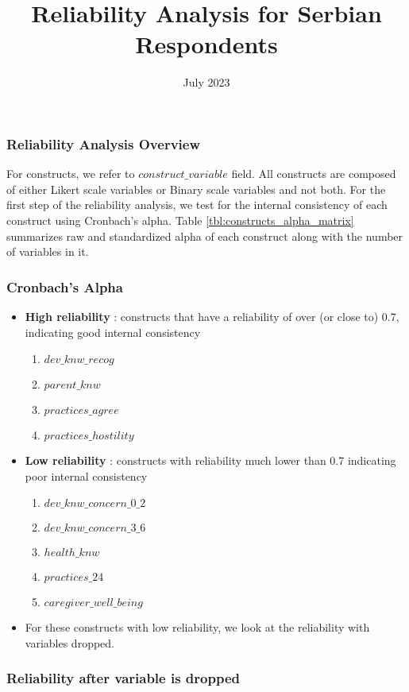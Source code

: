 \documentclass{article}
\title{Reliability Analysis for Serbian Respondents}
\date{July 2023}
\begin{document}
\subsubsection*{Reliability Analysis Overview}

For constructs, we refer to $construct\_variable$ field. All constructs are composed of either Likert scale variables or Binary scale variables and not both. For the first step of the reliability analysis, we test for the internal consistency of each construct using Cronbach's alpha. Table \ref{tbl:constructs_alpha_matrix} summarizes raw and standardized alpha of each construct along with the number of variables in it.

\subsubsection*{Cronbach's Alpha}

\begin{itemize}
    \item \textbf{High reliability} : constructs that have a reliability of over (or close to) 0.7, indicating good internal consistency
    \begin{enumerate}
        \item $dev\_knw\_recog$
        \item $parent\_knw$
        \item $practices\_agree$
        \item $practices\_hostility$
    \end{enumerate}
    \item \textbf{Low reliability} : constructs with reliability much lower than 0.7 indicating poor internal consistency
    \begin{enumerate}
        \item $dev\_knw\_concern\_0\_2$
        \item $dev\_knw\_concern\_3\_6$
        \item $health\_knw$
        \item $practices\_24$
        \item $caregiver\_well\_being$
    \end{enumerate}
 

    \item For these constructs with low reliability, we look at the reliability with variables dropped.
\end{itemize}


\subsubsection*{Reliability after variable is dropped}
\end{document}
